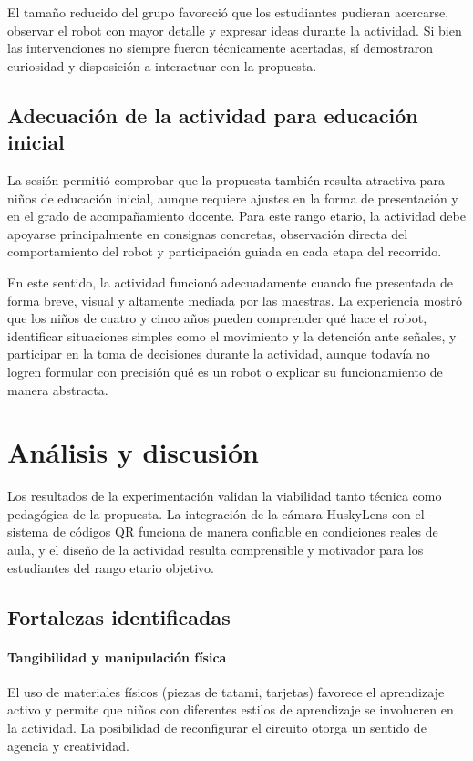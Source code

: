 \documentclass{prgrado}
\begin{document}
El tamaño reducido del grupo favoreció que los estudiantes pudieran acercarse, observar el robot con mayor detalle y expresar ideas durante la actividad. Si bien las intervenciones no siempre fueron técnicamente acertadas, sí demostraron curiosidad y disposición a interactuar con la propuesta.
\subsection{Adecuación de la actividad para educación inicial}
La sesión permitió comprobar que la propuesta también resulta atractiva para niños de educación inicial, aunque requiere ajustes en la forma de presentación y en el grado de acompañamiento docente. Para este rango etario, la actividad debe apoyarse principalmente en consignas concretas, observación directa del comportamiento del robot y participación guiada en cada etapa del recorrido.

En este sentido, la actividad funcionó adecuadamente cuando fue presentada de forma breve, visual y altamente mediada por las maestras. La experiencia mostró que los niños de cuatro y cinco años pueden comprender qué hace el robot, identificar situaciones simples como el movimiento y la detención ante señales, y participar en la toma de decisiones durante la actividad, aunque todavía no logren formular con precisión qué es un robot o explicar su funcionamiento de manera abstracta.

\section{Análisis y discusión}
Los resultados de la experimentación validan la viabilidad tanto técnica como pedagógica de la propuesta. La integración de la cámara HuskyLens con el sistema de códigos QR funciona de manera confiable en condiciones reales de aula, y el diseño de la actividad resulta comprensible y motivador para los estudiantes del rango etario objetivo.
\subsection{Fortalezas identificadas}
\paragraph{Tangibilidad y manipulación física} El uso de materiales físicos (piezas de tatami, tarjetas) favorece el aprendizaje activo y permite que niños con diferentes estilos de aprendizaje se involucren en la actividad. La posibilidad de reconfigurar el circuito otorga un sentido de agencia y creatividad.
\end{document}
